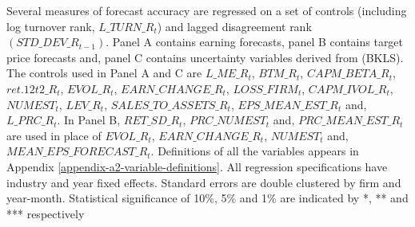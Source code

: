 \begin{table}
\begin{threeparttable}
\begin{tablenotes}
\item Several measures of forecast accuracy are regressed on a set of controls (including log turnover rank, $L\_TURN\_R_t$) and lagged disagreement rank $(STD\_DEV\_R_{t-1})$. Panel A contains earning forecasts, panel B contains target price forecasts and, panel C contains uncertainty variables derived from \cite{barron_etal1998} (BKLS). The controls used in Panel A and C are $L\_ME\_R_t$, $BTM\_R_t$, $CAPM\_BETA\_R_t$, $ret.12t2\_R_t$, $EVOL\_R_t$, $EARN\_CHANGE\_R_t$, $LOSS\_FIRM_t$, $CAPM\_IVOL\_R_t$, $NUMEST_t$, $LEV\_R_t$, $SALES\_TO\_ASSETS\_R_t$, $EPS\_MEAN\_EST\_R_t$ and, $L\_PRC\_R_t$. In Panel B, $RET\_SD\_R_t$, $PRC\_NUMEST_t$ and, $PRC\_MEAN\_EST\_R_t$ are used in place of $EVOL\_R_t$, $EARN\_CHANGE\_R_t$, $NUMEST_t$ and, $MEAN\_EPS\_FORECAST\_R_t$. Definitions of all the variables appears in Appendix \ref{appendix-a2-variable-definitions}. All regression specifications have industry and year fixed effects. Standard errors are double clustered by firm and year-month. Statistical significance of 10\%, 5\% and 1\% are indicated by *, ** and *** respectively
\end{tablenotes}
\end{threeparttable}


\end{table}
